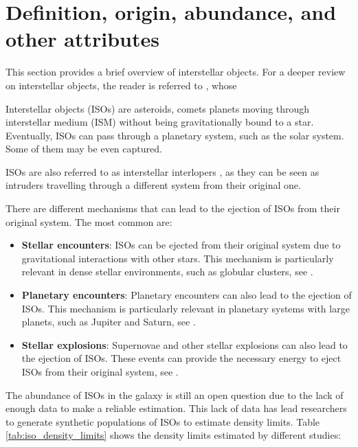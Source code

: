 \section{Definition, origin, abundance, and other attributes}

This section provides a brief overview of interstellar objects. For a deeper
review on interstellar objects, the reader is referred to \cite{jewitt2023},
whose 

Interstellar objects (ISOs) are asteroids, comets planets moving through
interstellar medium (ISM) without being gravitationally bound to a star.
Eventually, ISOs can pass through a planetary system, such as the solar system.
Some of them may be even captured.

ISOs are also referred to as interstellar interlopers \cite{jewitt2023}, as they
can be seen as intruders travelling through a different system from their
original one.

There are different mechanisms that can lead to the ejection of ISOs from their
original system. The most common are:

\begin{itemize}
    \item \textbf{Stellar encounters}: ISOs can be ejected from their original
          system due to gravitational interactions with other stars. This
          mechanism is particularly relevant in dense stellar environments, such
          as globular clusters, see \cite{portegies2018}.
            
    \item \textbf{Planetary encounters}: Planetary encounters can also lead to
        the ejection of ISOs. This mechanism is particularly relevant in
        planetary systems with large planets, such as Jupiter and Saturn, see
        \cite{kaib2011}.
          
    \item \textbf{Stellar explosions}: Supernovae and other stellar explosions
        can also lead to the ejection of ISOs. These events can provide the
        necessary energy to eject ISOs from their original system, see
        \cite{portegies2018}.
\end{itemize}

The abundance of ISOs in the galaxy is still an open question due to the lack of
enough data to make a reliable estimation. This lack of data has lead
researchers to generate synthetic populations of ISOs to estimate density
limits. Table \ref{tab:iso_density_limits} shows the density limits estimated
by different studies:

